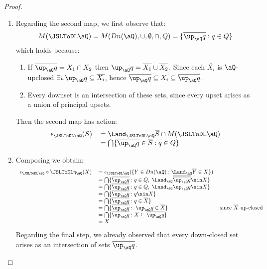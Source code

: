 \documentclass{article}
\begin{document}
\begin{proof}
\begin{enumerate}
\item
Regarding the second map, we first observe that:
\[
M(\JSLToDL \aQ) = M(Dn(\aQ),\cup,\emptyset,\cap,Q) = \{ \overline{\up_\aQ q} : q \in Q \}
\]
which holds because:
\begin{enumerate}
\item
If $\overline{\up_\aQ q} = X_1 \cap X_2$ then $\up_\aQ q = \overline{X_1} \cup \overline{X_2}$. Since each $\overline{X_i}$ is $\aQ$-upclosed $\exists i.\up_\aQ q \subseteq \overline{X_i}$, hence $\overline{\up_\aQ q} \subseteq X_i \subseteq \overline{\up_\aQ q}$.
\item
Every downset is an intersection of these sets, since every upset arises as a union of principal upsets.
\end{enumerate}

Then the second map has action:
\[
\begin{tabular}{lll}
$\epsilon_{\JSLToDL \aQ}(S)$
&
$= \Land_{\JSLToDL\aQ} \overline{S} \cap M(\JSLToDL\aQ)$
\\&
$= \bigcap \{ \overline{\up_\aQ q} \in \overline{S} : q \in Q \}$
\end{tabular}
\]

\item
Composing we obtain:
\[
\begin{tabular}{lll}
$\epsilon_{\JSLToDL \aQ} \circ \JSLToDL \eta_\aQ(X)$
&
$= \epsilon_{\JSLToDL \aQ}(\{ Y \in Dn(\aQ) : \Land_\aQ \overline{Y} \in X \})$
\\&
$= \bigcap \{ \overline{\up_\aQ q} : q \in Q, \; \Land_\aQ \overline{\overline{\up_\aQ q}} \nin X \} $
\\&
$= \bigcap \{ \overline{\up_\aQ q} : q \in Q, \; \Land_\aQ \up_\aQ q \nin X \} $
\\&
$= \bigcap \{ \overline{\up_\aQ q} : q \nin X \} $
\\&
$= \bigcap \{ \overline{\up_\aQ q} : q \in \overline{X} \} $
\\&
$= \bigcap \{ \overline{\up_\aQ q} : \; \up_\aQ q \in \overline{X} \} $
& since $\overline{X}$ up-closed
\\&
$= \bigcap \{ \overline{\up_\aQ q} : X \subseteq \overline{\up_\aQ q} \} $
\\&
$= X$
\end{tabular}
\]
Regarding the final step, we already observed that every down-closed set arises as an intersection of sets $\overline{\up_\aQ q}$.
\end{enumerate}


\end{proof}
\end{document}
